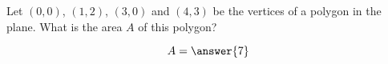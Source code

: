 \documentclass{ximera}
\author{Gregory Hartman \and Matthew Carr}
\begin{document}
\begin{exercise}

Let $(0,0)$, $(1,2)$, $(3,0)$  and $(4,3)$ be the vertices of a polygon in the plane. What is the area $A$ of this polygon?
\begin{prompt}
\[
A=\answer{7}
\]
\end{prompt}


\end{exercise}
\end{document}
